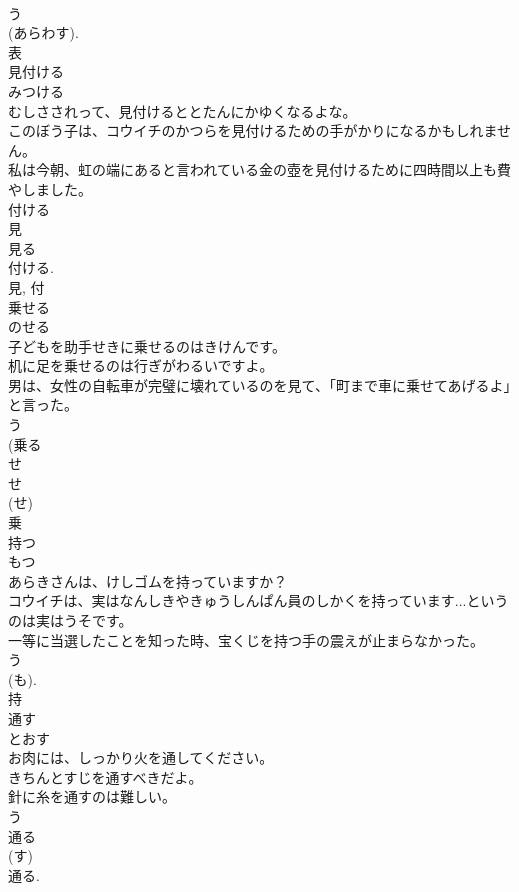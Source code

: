 \documentclass[8pt]{extreport}
\begin{document}
\begin{CJK}{UTF8}{min}
\\	う 
\\	(あらわす). 
\\	表	
\\	見付ける	
\\	みつける	
\\	むしさされって、見付けるととたんにかゆくなるよな。	
\\	このぼう子は、コウイチのかつらを見付けるための手がかりになるかもしれません。	
\\	私は今朝、虹の端にあると言われている金の壺を見付けるために四時間以上も費やしました。	
\\	付ける 
\\	見 
\\	見る 
\\	付ける. 
\\	見, 付	
\\	乗せる	
\\	のせる	
\\	子どもを助手せきに乗せるのはきけんです。	
\\	机に足を乗せるのは行ぎがわるいですよ。	
\\	男は、女性の自転車が完璧に壊れているのを見て、「町まで車に乗せてあげるよ」と言った。	
\\	う 
\\	(乗る 
\\	せ 
\\	せ 
\\	(せ) 
\\	乗	
\\	持つ	
\\	もつ	
\\	あらきさんは、けしゴムを持っていますか？	
\\	コウイチは、実はなんしきやきゅうしんぱん員のしかくを持っています...というのは実はうそです。	
\\	一等に当選したことを知った時、宝くじを持つ手の震えが止まらなかった。	
\\	う 
\\	(も). 
\\	持	
\\	通す	
\\	とおす	
\\	お肉には、しっかり火を通してください。	
\\	きちんとすじを通すべきだよ。	
\\	針に糸を通すのは難しい。	
\\	う 
\\	通る 
\\	(す) 
\\	通る. 

\end{CJK}
\end{document}

